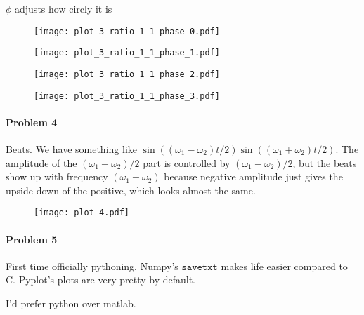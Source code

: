 \documentclass[12pt, oneside, letterpaper, fleqn]{article}
\newcommand{\w}{\omega}
\begin{document}
\begin{enumerate}
$\phi$ adjusts how circly it is
\begin{figure}[htbp]
\texttt{[image: plot\_3\_ratio\_1\_1\_phase\_0.pdf]}
\end{figure}
\begin{figure}[htbp]
\texttt{[image: plot\_3\_ratio\_1\_1\_phase\_1.pdf]}
\end{figure}
\begin{figure}[htbp]
\texttt{[image: plot\_3\_ratio\_1\_1\_phase\_2.pdf]}
\end{figure}
\begin{figure}[htbp]
\texttt{[image: plot\_3\_ratio\_1\_1\_phase\_3.pdf]}
\end{figure}
\end{enumerate}

\pagebreak
\paragraph{Problem 4}
Beats. We have something like $\sin((\w_1 - \w_2)t/2)\sin((\w_1 +
\w_2)t/2)$. The amplitude of the $(\w_1 + \w_2)/2$ part is controlled by
$(\w_1 - \w_2)/2$, but the beats show up with frequency $(\w_1 - \w_2)$
because negative amplitude just gives the upside down of the positive,
which looks almost the same.
\begin{figure}[htbp]
\texttt{[image: plot\_4.pdf]}
\end{figure}

\paragraph{Problem 5}
First time officially pythoning. Numpy's $\texttt{savetxt}$ makes life
easier compared to C. Pyplot's plots are very pretty by default.

I'd prefer python over matlab.
\end{document}
